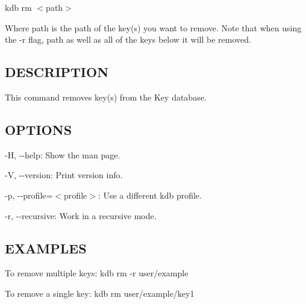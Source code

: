 {\ttfamily kdb rm $<$path$>$}

Where {\ttfamily path} is the path of the key(s) you want to remove. Note that when using the {\ttfamily -\/r} flag, {\ttfamily path} as well as all of the keys below it will be removed.

\subsection*{D\+E\+S\+C\+R\+I\+P\+T\+I\+O\+N}

This command removes key(s) from the Key database.

\subsection*{O\+P\+T\+I\+O\+N\+S}


\begin{DoxyItemize}
\item {\ttfamily -\/\+H}, {\ttfamily -\/-\/help}\+: Show the man page.
\item {\ttfamily -\/\+V}, {\ttfamily -\/-\/version}\+: Print version info.
\item {\ttfamily -\/p}, {\ttfamily -\/-\/profile}=$<$profile$>$\+: Use a different kdb profile.
\item {\ttfamily -\/r}, {\ttfamily -\/-\/recursive}\+: Work in a recursive mode.
\end{DoxyItemize}

\subsection*{E\+X\+A\+M\+P\+L\+E\+S}

To remove multiple keys\+: {\ttfamily kdb rm -\/r user/example}

To remove a single key\+: {\ttfamily kdb rm user/example/key1} 